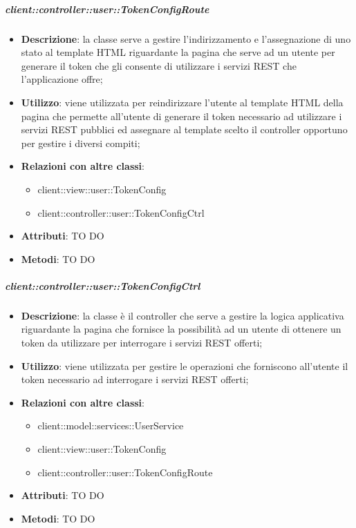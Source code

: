 		\subparagraph{client::controller::user::TokenConfigRoute} %
		\label{subp:bdsm_app_client_controller_user_tokenconfigroute}
			\begin{itemize}
				\item \textbf{Descrizione}: la classe serve a gestire l'indirizzamento e l'assegnazione di uno stato al template HTML riguardante la pagina che serve ad un utente per generare il token che gli consente di utilizzare i servizi REST che l'applicazione offre;
				\item \textbf{Utilizzo}: viene utilizzata per reindirizzare l'utente al template HTML della pagina che permette all'utente di generare il token necessario ad utilizzare i servizi REST pubblici ed assegnare al template scelto il controller opportuno per gestire i diversi compiti;
				\item \textbf{Relazioni con altre classi}:
					\begin{itemize}
						\item client::view::user::TokenConfig
						\item client::controller::user::TokenConfigCtrl
					\end{itemize}
				\item \textbf{Attributi}: TO DO
				\item \textbf{Metodi}: TO DO
			\end{itemize}

		\subparagraph{client::controller::user::TokenConfigCtrl} %
		\label{subp:client_controller_user_tokenconfigctrl}
			\begin{itemize}
				\item \textbf{Descrizione}: la classe è il controller che serve a gestire la logica applicativa riguardante la pagina che fornisce la possibilità ad un utente di ottenere un token da utilizzare per interrogare i servizi REST offerti;
				\item \textbf{Utilizzo}: viene utilizzata per gestire le operazioni che forniscono all'utente il token necessario ad interrogare i servizi REST offerti;
				\item \textbf{Relazioni con altre classi}:
					\begin{itemize}
						\item client::model::services::UserService
						\item client::view::user::TokenConfig
						\item client::controller::user::TokenConfigRoute
					\end{itemize}
				\item \textbf{Attributi}: TO DO
				\item \textbf{Metodi}: TO DO
			\end{itemize}

